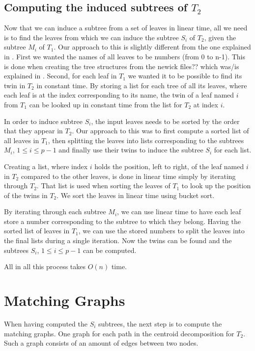 \subsection{Computing the induced subtrees of $T_2$}
Now that we can induce a subtree from a set of leaves in linear time, all we need is to find the leaves from which we can induce the subtree $S_i$ of $T_2$, given the subtree $M_i$ of $T_1$. Our approach to this is slightly different from the one explained in \cite{nlogn} . First we wanted the names of all leaves to be numbers (from 0 to n-1). This is done when creating the tree structures from the newick files?? which was/is explained in . Second, for each leaf in $T_1$ we wanted it to be possible to find its twin in $T_2$ in constant time. By storing a list for each tree of all its leaves, where each leaf is at the index corresponding to its name, the twin of a leaf named $i$ from $T_1$ can be looked up in constant time from the list for $T_2$ at index $i$.

In order to induce subtree $S_i$, the input leaves needs to be sorted by the order that they appear in $T_2$. Our approach to this was to first compute a sorted list of all leaves in $T_1$, then splitting the leaves into lists corresponding to the subtrees $M_i$, $1 \le i \le p-1$ and finally use their twins to induce the subtree $S_i$ for each list.

Creating a list, where index $i$ holds the position, left to right, of the leaf named $i$ in $T_2$ compared to the other leaves, is done in linear time simply by iterating through $T_2$. That list is used when sorting the leaves of $T_1$ to look up the position of the twins in $T_2$. We sort the leaves in linear time using bucket sort.

By iterating through each subtree $M_i$, we can use linear time to have each leaf store a number corresponding to the subtree to which they belong. Having the sorted list of leaves in $T_1$, we can use the stored numbers to split the leaves into the final lists during a single iteration. Now the twins can be found and the subtrees $S_i$, $1 \le i \le p-1$ can be computed.

All in all this process takes $O(n)$ time.

\section{Matching Graphs}
When having computed the $S_i$ subtrees, the next step is to compute the matching graphs. One graph for each path in the centroid decomposition for $T_2$. Such a graph consists of an amount of edges between two nodes.


